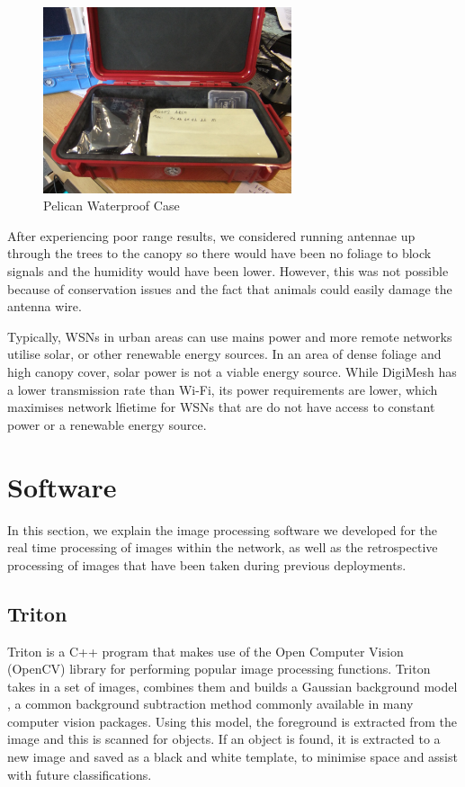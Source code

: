 			\begin{figure}[h]
			\centering
			\includegraphics[width=0.65\textwidth]{Chap3/figures/pelican}
			\caption{Pelican Waterproof Case}
			\label{fig:tech:pelican}
			\end{figure}

	After experiencing poor range results, we considered running antennae up through the trees to the canopy so there would have been no foliage to block signals and the humidity would have been lower. However, this was not possible because of conservation issues and the fact that animals could easily damage the antenna wire.

	Typically, WSNs in urban areas can use mains power and more remote networks utilise solar, or other renewable energy sources. In an area of dense foliage and high canopy cover, solar power is not a viable energy source. While DigiMesh has a lower transmission rate than Wi-Fi, its power requirements are lower, which maximises network lfietime for WSNs that are do not have access to constant power or a renewable energy source.

\section{Software}\label{tech:sw}
	In this section, we explain the image processing software we developed for the real time processing of images within the network, as well as the retrospective processing of images that have been taken during previous deployments.

	\subsection{Triton} \label{tech:sf:triton}
		Triton is a C++ program that makes use of the Open Computer Vision (OpenCV) library for performing popular image processing functions. Triton takes in a set of images, combines them and builds a Gaussian background model \cite{Zivkovic2004}, a common background subtraction method commonly available in many computer vision packages. Using this model, the foreground is extracted from the image and this is scanned for objects. If an object is found, it is extracted to a new image and saved as a black and white template, to minimise space and assist with future classifications.
		

